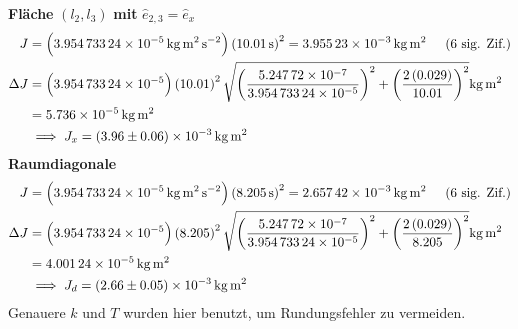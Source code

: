             \textbf{Fläche} $(l_2, l_3)$ \textbf{mit} $\hat{e}_{2,3} = \hat{e}_x$ 
            \begin{align}
                J &= \left(\SI{3.95473324e-5}{\kilo\gram\meter\squared\per\second\squared}\right)\left(\SI{10.01}{\second}\right)^2 = \SI{3.95523e-3}{\kilo\gram\meter\squared} \sigfig{6} \\
                \Delta J &= \left(\SI{3.95473324e-5}{}\right)\left(\SI{10.01}{}\right)^2 \sqrt{\left(\frac{\SI{5.24772e-7}{}}{\SI{3.95473324e-5}{}}\right)^2 + \left(\frac{2\left(\SI{0.029}{}\right)}{\SI{10.01}{}}\right)^2} \SI{}{\kilo\gram\meter\squared} \notag \\
                &= \SI{5.736e-5}{\kilo\gram\meter\squared} \\
                &\implies J_x = \SI{3.96(6)e-3}{\kilo\gram\meter\squared}
            \end{align}
            \textbf{Raumdiagonale}
            \begin{align}
                J &= \left(\SI{3.95473324e-5}{\kilo\gram\meter\squared\per\second\squared}\right)\left(\SI{8.205}{\second}\right)^2 = \SI{2.65742e-3}{\kilo\gram\meter\squared} \sigfig{6} \\
                \Delta J &= \left(\SI{3.95473324e-5}{}\right)\left(\SI{8.205}{}\right)^2 \sqrt{\left(\frac{\SI{5.24772e-7}{}}{\SI{3.95473324e-5}{}}\right)^2 + \left(\frac{2\left(\SI{0.029}{}\right)}{\SI{8.205}{}}\right)^2} \SI{}{\kilo\gram\meter\squared} \notag \\
                &= \SI{4.00124e-5}{\kilo\gram\meter\squared} \\
                &\implies J_d = \SI{2.66(5)e-3}{\kilo\gram\meter\squared}
            \end{align}
            Genauere $k$ und $T$ wurden hier benutzt, um Rundungsfehler zu vermeiden. 

